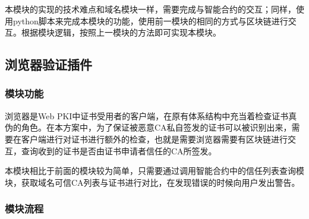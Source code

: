 本模块的实现的技术难点和域名模块一样，需要完成与智能合约的交互；同样，使用python脚本来完成本模块的功能，使用前一模块的相同的方式与区块链进行交互。根据模块逻辑，按照上一模块的方法即可实现本模块。










	



\subsection{浏览器验证插件}

\subsubsection{模块功能}

浏览器是Web PKI中证书受用者的客户端，在原有体系结构中充当着检查证书真伪的角色。在本方案中，为了保证被恶意CA私自签发的证书可以被识别出来，需要在客户端进行对证书进行额外的检查，也就是需要浏览器需要有区块链进行交互，查询收到的证书是否由证书申请者信任的CA所签发。

本模块相比于前面的模块较为简单，只需要通过调用智能合约中的信任列表查询模块，获取域名可信CA列表与证书进行对比，在发现错误的时候向用户发出警告。



\subsubsection{模块流程}

